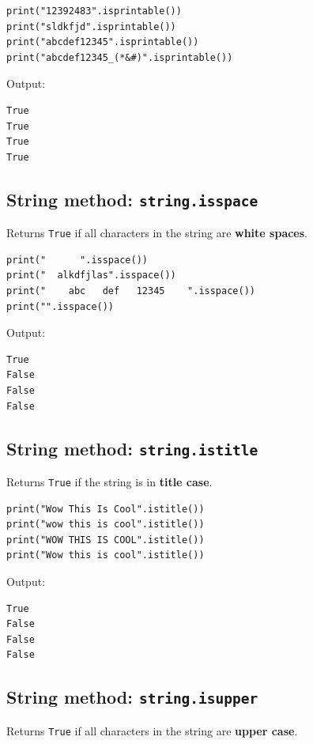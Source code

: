 \documentclass[11pt]{article}
\begin{document}
\begin{verbatim}
print("12392483".isprintable())
print("sldkfjd".isprintable())
print("abcdef12345".isprintable())
print("abcdef12345_(*&#)".isprintable())
\end{verbatim}

 \noindent Output:

\begin{verbatim}
True
True
True
True
\end{verbatim}


 \newpage

\subsection{String method: \texttt{string.isspace}}
\label{sec:org198c795}
Returns \texttt{True} if all characters in the string are \textbf{white spaces}.

\begin{verbatim}
print("      ".isspace())
print("  alkdfjlas".isspace())
print("    abc   def   12345    ".isspace())
print("".isspace())
\end{verbatim}

 \noindent Output:

\begin{verbatim}
True
False
False
False
\end{verbatim}

\subsection{String method: \texttt{string.istitle}}
\label{sec:org8fdcf32}
Returns \texttt{True} if the string is in \textbf{title case}.

\begin{verbatim}
print("Wow This Is Cool".istitle())
print("wow this is cool".istitle())
print("WOW THIS IS COOL".istitle())
print("Wow this is cool".istitle())
\end{verbatim}

 \noindent Output:

\begin{verbatim}
True
False
False
False
\end{verbatim}


 \newpage

\subsection{String method: \texttt{string.isupper}}
\label{sec:orged4d8f0}
Returns \texttt{True} if all characters in the string are \textbf{upper case}.
\end{document}
